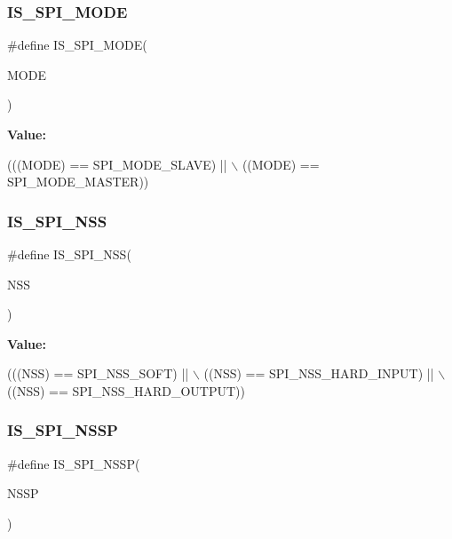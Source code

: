 \subsubsection{\texorpdfstring{I\+S\+\_\+\+S\+P\+I\+\_\+\+M\+O\+DE}{IS\_SPI\_MODE}}
{\footnotesize\ttfamily \#define I\+S\+\_\+\+S\+P\+I\+\_\+\+M\+O\+DE(\begin{DoxyParamCaption}\item[{}]{M\+O\+DE }\end{DoxyParamCaption})}

{\bfseries Value\+:}
\begin{DoxyCode}
(((MODE) == SPI\_MODE\_SLAVE) || \(\backslash\)
                           ((MODE) == SPI\_MODE\_MASTER))
\end{DoxyCode}
\mbox{\label{group___s_p_i___private___macros_gabbeedf42eccef1bae4f88c606fc3b261}} 
\subsubsection{\texorpdfstring{I\+S\+\_\+\+S\+P\+I\+\_\+\+N\+SS}{IS\_SPI\_NSS}}
{\footnotesize\ttfamily \#define I\+S\+\_\+\+S\+P\+I\+\_\+\+N\+SS(\begin{DoxyParamCaption}\item[{}]{N\+SS }\end{DoxyParamCaption})}

{\bfseries Value\+:}
\begin{DoxyCode}
(((NSS) == SPI\_NSS\_SOFT)       || \(\backslash\)
                         ((NSS) == SPI\_NSS\_HARD\_INPUT) || \(\backslash\)
                         ((NSS) == SPI\_NSS\_HARD\_OUTPUT))
\end{DoxyCode}
\mbox{\label{group___s_p_i___private___macros_ga9bbb9935c81663db6b96a2cb08ef6006}} 
\subsubsection{\texorpdfstring{I\+S\+\_\+\+S\+P\+I\+\_\+\+N\+S\+SP}{IS\_SPI\_NSSP}}
{\footnotesize\ttfamily \#define I\+S\+\_\+\+S\+P\+I\+\_\+\+N\+S\+SP(\begin{DoxyParamCaption}\item[{}]{N\+S\+SP }\end{DoxyParamCaption})}

